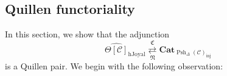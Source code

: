 \documentclass[leqno]{article}
\numberwithin{equation}{subsection}
\theoremstyle{plain}   %
\newtheorem{prop}[equation]{Proposition}
\newtheorem{cor}[equation]{Corollary}
\theoremstyle{remark}
\theoremstyle{plain}
\newcommand{\Nec}{\ensuremath{{\mathcal{N}ec}}}
\newcommand{\Cat}{\ensuremath{\mathbf{Cat}}}
\newcommand{\overcat}[2]{{\left(#1\downarrow #2\right)}}
\newcommand{\C}{\ensuremath{\mathcal{C}}}
\newcommand{\cellset}{\ensuremath{\widehat{\Theta[\mathcal{C}]}}}
\newcommand{\spsh}{\ensuremath{\operatorname{Psh}_\Delta(\mathcal{C})}}
\begin{document}
\begin{comment}
		When \(\mathcal{G}\) is closed under wedges, we can define the \(\spsh\)-enriched category \(\mathfrak{C}^{\mathcal{G}}(X)	\) to be the category whose objects are the vertices of \(X\) and whose Hom-objects are
		\[\mathfrak{C}^{\mathcal{G}}(X)(x,y)_\cdot.\]
		This defines an enriched category by taking the composition operation to be concatenation of gadgets, which works since \	(\mathcal{G}\) is closed under wedges.
	\end{defn}
	\begin{prop}\label{gadgetlemma}
		Given a \(\C\)-cellular set \(X\) and two vertices \(x,y\) of \(X\) and a category of gadgets \(\mathcal{G}\) the map \	[N\overcat{\Nec^\mathbf{sp}_c}{X_{x,y}} \hookrightarrow N\overcat{\mathcal{G}_c}{X_{x,y}}\] is a weak homotopy 	equivalence.
	\end{prop}
	\begin{proof}
		By Quillen's theorem A, it suffices to look at the overcategories \(\overcat{\Nec^\mathbf{sp}_c}{G(c)}\) along the 	inclusion \(\Nec^\mathbf{sp}_c\hookrightarrow \mathcal{G}_c\) for all \(G\) in \(\mathcal{G}\) and show that their nerves 	are contractible, but these overcategories correspond on-the-nose to the subcategories classifying the diagonal component 	of \(\mathfrak{C}^\Nec(G)(\alpha,\omega)\), which is contractible because \(G\) is a gadget.
	\end{proof}
	\begin{cor}
		The constructions \(\mathfrak{C}^\Nec\) and \(\mathfrak{C}^\mathcal{G}\) are naturally weakly equivalent when \(\mathcal	{G}\) is closed under wedges.
	\end{cor}
	\begin{proof}
		The map between the two constructions is the identity on objects and induces Hom-wise weak equivalences of simplicial 	presheaves.
	\end{proof}
\end{comment}


\subsection{Quillen functoriality}
In this section, we show that the adjunction \[\cellset_{\mathrm{hJoyal}} \underset{\mathfrak{N}}{\overset{\mathfrak{C}}{\rightleftarrows}} \Cat_{\spsh_{\mathrm{inj}}}\] is a Quillen pair. We begin with the following observation:
\end{document}
